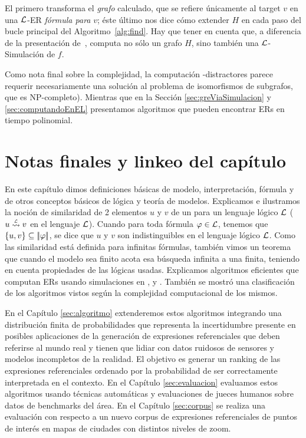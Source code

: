El primero transforma el {\em grafo} calculado, que se refiere \'unicamente al target $v$ en una $\mathcal{L}$-ER {\em
f\'ormula para} $v$; \'este \'ultimo nos dice c\'omo extender $H$ en cada paso
del bucle principal del Algoritmo~\ref{alg:find}. Hay que tener en cuenta que, a diferencia de la
presentaci\'on de~\cite{graph},  computa
no s\'olo un grafo $H$, sino tambi\'en una $\mathcal{L}$-Simulaci\'on de $f$.

Como nota final sobre la complejidad, la computaci\'on
\EPFOL-distractores parece requerir necesariamente una soluci\'on al problema de isomorfismos de subgrafos, que es NP-completo). Mientras que en la Secci\'on \ref{sec:greViaSimulacion} y \ref{sec:computandoEnEL} presentamos algoritmos que pueden encontrar ERs en tiempo polinomial.


\section{Notas finales y linkeo del cap\'itulo}
\label{sec:notasFinales}

En este cap\'itulo dimos definiciones b\'asicas de modelo, interpretaci\'on, f\'ormula y de otros conceptos b\'asicos de l\'ogica y teor\'ia de modelos. Explicamos e ilustramos la noci\'on de similaridad de 2 elementos $u$ y $v$ de un para un lenguaje l\'ogico $\mathcal{L}$ ($u \simil{\+L} v$ en el lenguaje $\mathcal{L}$). Cuando para toda f\'ormula $\varphi \in \mathcal{L}$, tenemos que $\{u,v\} \subseteq |\!|\varphi|\!|$,  se dice que $u$ y $v$ son indistinguibles en el lenguaje l\'ogico $\mathcal{L}$. Como las similaridad est\'a definida para infinitas f\'ormulas, tambi\'en vimos un teorema que cuando el modelo sea finito acota esa b\'usqueda
infinita a una finita, teniendo en cuenta propiedades de las l\'ogicas usadas. Explicamos algoritmos eficientes que computan ERs usando simulaciones en \FOL, \ALC y \EL. Tambi\'en se mostr\'o una clasificaci\'on de los algoritmos vistos seg\'un la complejidad computacional de los mismos. 

En el Cap\'itulo \ref{sec:algoritmo} extenderemos estos algoritmos integrando una distribuci\'on finita de probabilidades que representa la incertidumbre presente en posibles aplicaciones de la generaci\'on de expresiones referenciales que deben referirse al mundo real y tienen que lidiar con datos ruidosos de sensores y modelos incompletos de la realidad. El objetivo es generar un ranking de las expresiones referenciales ordenado por la probabilidad de ser correctamente interpretada en el contexto. En el Cap\'itulo \ref{sec:evaluacion} evaluamos estos algoritmos usando t\'ecnicas autom\'aticas y evaluaciones de jueces humanos sobre datos de benchmarks del \'area. En el Cap\'itulo \ref{sec:corpus} se realiza una evaluaci\'on con respecto a un nuevo corpus de expresiones referenciales de puntos de inter\'es en mapas de ciudades con distintos niveles de zoom. 



